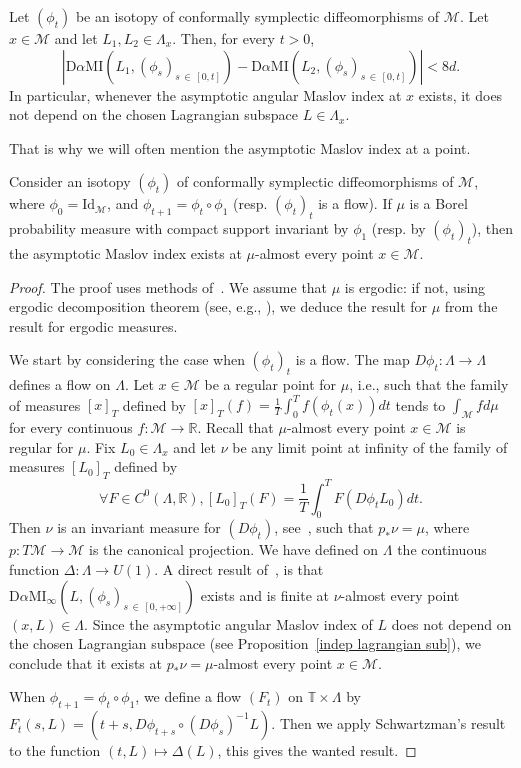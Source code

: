\documentclass[AHL, Unicode, longabstracts, published]{cedram}
\newcommand*\M{\mathcal{M}}
\newcommand*\cm{\mathcal{M}}
\newcommand{\rId}{\mathrm{Id}}
\newcommand{\MI}{\mathrm{MI}}
\newcommand{\rmD}{\mathrm{D}}
\newcommand*\R{\mathbb{R}}
\newcommand*\T{\mathbb{T}}
\let\oldforall\forall
\renewcommand*{\forall}{\mathrel{\oldforall}}
\begin{document}
\begin{prop}\label{indep lagrangian sub}
Let $(\phi_t) $ be an isotopy of conformally symplectic diffeomorphisms of $\M$. Let $x\in \M$ and let $L_1,L_2\in\Lambda_x$. Then, for every $t>0$,
\[
\left\vert \rmD\alpha\MI\left(L_1,(\phi_s)_{s\,\in\,[0,t]}\right)-\rmD\alpha\MI\left(L_2,(\phi_s)_{s\,\in\,[0,t]}\right)\right\vert < 8d.
\]
In particular, whenever the asymptotic angular Maslov index at $x$ exists, it does not depend on the chosen Lagrangian subspace $L\in\Lambda_x$.
\end{prop}
 
That is why we will often mention the asymptotic Maslov index at a point.

\begin{prop}\label{MI existence SCH}
Consider an isotopy $(\phi_t) $ of conformally symplectic diffeomorphisms of $\M$, where $\phi_0=\rId_\M$, and $\phi_{t+1}= \phi_t\circ\phi_1$ (resp. $(\phi_t)_t$ is a flow). If $\mu$ is a Borel probability measure with compact support invariant by $\phi_1$ (resp. by $(\phi_t)_t$), then the asymptotic Maslov index exists at $\mu$-almost every point $x\in\cm$.
\end{prop}

\begin{proof}
The proof uses methods of~\cite[Section~4]{Schwartzman1957}. We assume that $\mu$ is ergodic: if not, using ergodic decomposition theorem (see, e.g., \cite{Mane1987}), we deduce the result for $\mu$ from the result for ergodic measures.

We start by considering the case when $(\phi_t)_t$ is a flow. The map $D\phi_t: \Lambda\rightarrow \Lambda$ defines a flow on $\Lambda$. Let $x\in\M$ be a regular point for $\mu$, i.e., such that the family of measures $[x]_T$ defined by $[x]_T(f)=\frac{1}{T}\int_0^Tf(\phi_t(x))dt$ tends to $\int_\cm fd\mu$ for every continuous $f:\M\rightarrow \R$. Recall that $\mu$-almost every point $x\in\M$ is regular for $\mu$. Fix $L_0\in \Lambda_x$ and let $\nu$ be any limit point at infinity of the family of measures $[L_0]_T$ defined by
\[
\forall F\in C^0(\Lambda, \R), [L_0]_T(F)=\frac{1}{T}\int_0^TF(D\phi_tL_0)dt.
\]
Then $\nu$ is an invariant measure for $(D\phi_t)$, see~\cite{BobKry1957}, such that $p_*\nu=\mu$, where $p:T\M\to\M$ is the canonical projection.
We have defined on $\Lambda$ the continuous function $\Delta:\Lambda\rightarrow U(1)$. A direct result of~\cite[Section~4]{Schwartzman1957}, is that $\rmD\alpha\MI_\infty(L,(\phi_s)_{s\,\in\,[0,+\infty]})$ exists and is finite at $\nu$-almost every point $(x, L)\in \Lambda$. Since the asymptotic angular Maslov index of $L$ does not depend on the chosen Lagrangian subspace (see Proposition~\ref{indep lagrangian sub}), we conclude that it exists at $p_*\nu=\mu$-almost every point $x\in\M$.


When $\phi_{t+1}=\phi_t\circ \phi_1$, we define a flow $(F_t)$ on $\T\times \Lambda$ by $F_t(s, L)= (t+s, D\phi_{t+s}\circ (D\phi_s)^{-1}L)$. Then we apply Schwartzman's result to the function $(t, L)\mapsto \Delta(L)$, this gives the wanted result.
\end{proof}
\end{document}
